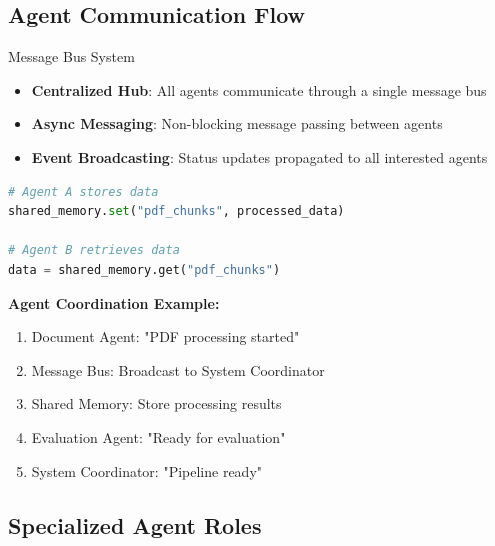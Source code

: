 \documentclass[12pt,a4paper]{article}
\begin{document}
\subsection{Agent Communication Flow}

\begin{infobox}{Message Bus System}
\begin{itemize}
    \item \textbf{Centralized Hub}: All agents communicate through a single message bus
    \item \textbf{Async Messaging}: Non-blocking message passing between agents
    \item \textbf{Event Broadcasting}: Status updates propagated to all interested agents
\end{itemize}
\end{infobox}

\begin{codebox}
\begin{lstlisting}[language=Python, caption=Shared Memory Architecture]
# Agent A stores data
shared_memory.set("pdf_chunks", processed_data)

# Agent B retrieves data
data = shared_memory.get("pdf_chunks")
\end{lstlisting}
\end{codebox}

\textbf{Agent Coordination Example:}
\begin{enumerate}
    \item Document Agent: "PDF processing started"
    \item Message Bus: Broadcast to System Coordinator
    \item Shared Memory: Store processing results
    \item Evaluation Agent: "Ready for evaluation"
    \item System Coordinator: "Pipeline ready"
\end{enumerate}

\subsection{Specialized Agent Roles}
\end{document}

